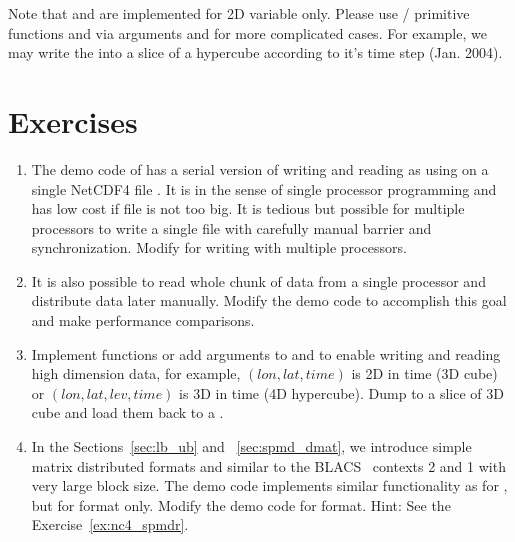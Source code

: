 Note that  and  are implemented
for 2D variable only. Please use / primitive functions
 and  via arguments 
and  for more complicated cases. For example, we may write
the  into a slice of a hypercube according to it's time step
(Jan. 2004).


\section{Exercises}
\label{sec:pbdNCDF4_exercise}

\begin{enumerate}[label=\thechapter-\arabic*]
\item
The demo code  of  has a serial version
of writing and reading  as using  on a single
NetCDF4 file . It is in the sense of single processor
programming and has low cost if file is not too big.
It is tedious but possible for multiple processors to write
a single file with carefully manual barrier and synchronization.
Modify  for writing with multiple processors.

\item
It is also possible to read whole chunk of data from a single processor
and distribute data later manually. Modify the demo code
 to accomplish this goal and make performance
comparisons.

\item
Implement functions or add arguments to  and
 to enable writing and reading high dimension data,
for example, $(lon, lat, time)$ is 2D in time (3D cube) or
$(lon, lat, lev, time)$ is 3D in time (4D hypercube).
Dump  to a slice of 3D cube and load them back to a
.

\item
In the Sections~\ref{sec:lb_ub} and ~\ref{sec:spmd_dmat}, we introduce
simple matrix distributed formats  and  similar to
the BLACS~ contexts  2 and 1 with very large block size.
The demo code
 implements similar functionality as for
, but for  format only. Modify the demo code for
 format.
{\color{blue}Hint: See the Exercise~\ref{ex:nc4_spmdr}.
}

\end{enumerate}

